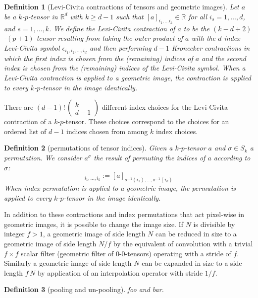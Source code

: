 \documentclass{article}
\theoremstyle{plain}
\newtheorem{definition}{Definition}
\renewcommand{\choose}[2]{\begin{pmatrix}{#1}\\{#2}\end{pmatrix}}
\begin{document}
\begin{definition}[Levi-Civita contractions of tensors and geometric images]
Let $a$ be a $k$-$p$-tensor in $\mathbb R^d$ with $k\geq d-1$ such that $[a]_{i_1,\ldots i_k}\in \mathbb R$ for all $i_s = 1,\ldots, d$, and $s=1,\ldots, k$. We define the Levi-Civita contraction of $a$ to be the $(k-d+2)$-$(p+1)$-tensor resulting from taking the outer product of 
$a$ with the $d$-index Levi-Civita symbol $\epsilon_{i_1,i_2,\ldots,i_d}$ and then performing $d-1$ Kronecker contractions in which the first index is chosen from the (remaining) indices of $a$ and the second index is chosen from the (remaining) indices of the Levi-Civita symbol.
When a Levi-Civita contraction is applied to a geometric image, the contraction is applied to every $k$-$p$-tensor in the image identically.
\end{definition}
There are $(d-1)!\,\choose{k}{d-1}$ different index choices for the Levi-Civita contraction of a $k$-$p$-tensor.
These choices correspond to the choices for an ordered list of $d-1$ indices chosen from among $k$ index choices.

\begin{definition}[permutations of tensor indices]
Given a $k$-$p$-tensor $a$ and $\sigma\in S_k$ a permutation. We consider $a^\sigma$ the result of permuting the indices of $a$ according to $\sigma$:
\begin{equation}
    [a^\sigma]_{i_1, \ldots, i_k} := [a]_{\sigma^{-1}(i_1), \ldots, \sigma^{-1}(i_k)}
\end{equation}
When index permutation is applied to a geometric image, the permutation is applied to every $k$-$p$-tensor in the image identically.
\end{definition}

In addition to these contractions and index permutations that act pixel-wise in geometric images, it is possible to change the image size.
If $N$ is divisible by integer $f>1$, a geometric image of side length $N$ can be reduced in size to a geometric image of side length $N/f$ by the equivalent of convolution with a trivial $f\times f$ scalar filter (geometric filter of 0-0-tensors) operating with a stride of $f$.
Similarly a geometric image of side length $N$ can be expanded in size to a side length $f\,N$ by application of an interpolation operator with stride $1/f$.
\begin{definition}[pooling and un-pooling]
foo and bar.
\end{definition}
\end{document}
